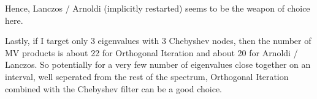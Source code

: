 \documentclass[a4paper]{article}
\begin{document}
  Hence, Lanczos / Arnoldi (implicitly restarted) seems to be the weapon of choice here.

  Lastly, if I target only 3 eigenvalues with 3 Chebyshev nodes, then the number of MV products is about 22 for Orthogonal Iteration and about 20 for Arnoldi / Lanczos. So potentially for a very few number of eigenvalues close together on an interval, well seperated from the rest of the spectrum, Orthogonal Iteration combined with the Chebyshev filter can be a good choice.
\end{document}

